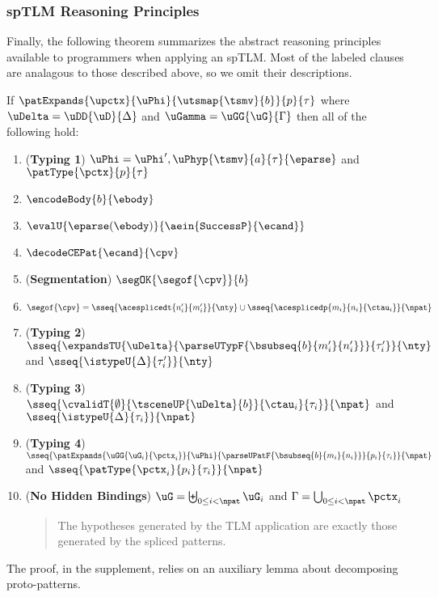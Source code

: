 \documentclass[acmsmall,10pt,review,anonymous]{acmart}\settopmatter{printfolios=true}
\begin{document}
\subsubsection{spTLM Reasoning Principles} Finally, the following theorem summarizes the abstract reasoning principles available to programmers when applying an spTLM. Most of the labeled clauses are analagous to those described above, so we omit their descriptions.
\begin{theorem}
If $\patExpands{\upctx}{\uPhi}{\utsmap{\tsmv}{b}}{p}{\tau}$ where $\uDelta=\uDD{\uD}{\Delta}$ and $\uGamma=\uGG{\uG}{\Gamma}$ then all of the following hold:
\begin{enumerate}
        \item (\textbf{Typing 1}) $\uPhi=\uPhi', \uPhyp{\tsmv}{a}{\tau}{\eparse}$ and $\patType{\pctx}{p}{\tau}$
        \item $\encodeBody{b}{\ebody}$
        \item $\evalU{\eparse(\ebody)}{\aein{\mathtt{SuccessP}}{\ecand}}$
        \item $\decodeCEPat{\ecand}{\cpv}$
        \item (\textbf{Segmentation}) $\segOK{\segof{\cpv}}{b}$
        \item $\segof{\cpv} = \sseq{\acesplicedt{n'_i}{m'_i}}{\nty} \cup \sseq{\acesplicedp{m_i}{n_i}{\ctau_i}}{\npat}$
        \item (\textbf{Typing 2}) $\sseq{
              \expandsTU{\uDelta}
              {
                \parseUTypF{\bsubseq{b}{m'_i}{n'_i}}
              }{\tau'_i}
            }{\nty}$ and $\sseq{\istypeU{\Delta}{\tau'_i}}{\nty}$
        \item (\textbf{Typing 3}) $\sseq{
          \cvalidT{\emptyset}{
            \tsceneUP
              {\uDelta}{b}
          }{
            \ctau_i
          }{\tau_i}
        }{\npat}$ and $\sseq{\istypeU{\Delta}{\tau_i}}{\npat}$
        \item (\textbf{Typing 4}) $\sseq{
          \patExpands
            {\uGG{\uG_i}{\pctx_i}}
            {\uPhi}
            {\parseUPatF{\bsubseq{b}{m_i}{n_i}}}
            {p_i}
            {\tau_i}
        }{\npat}$  and $\sseq{\patType{\pctx_i}{p_i}{\tau_i}}{\npat}$
      \item (\textbf{No Hidden Bindings}) $\uG = \biguplus_{0 \leq i < \npat} \uG_i$ and $\Gamma = \bigcup_{0 \leq i < \npat} \pctx_i$
        \begin{quote}
          The hypotheses generated by the TLM application are exactly those generated by the spliced patterns.
        \end{quote}
\end{enumerate}
\end{theorem}
The proof, in the supplement, relies on an auxiliary lemma about decomposing proto-patterns.
\end{document}
